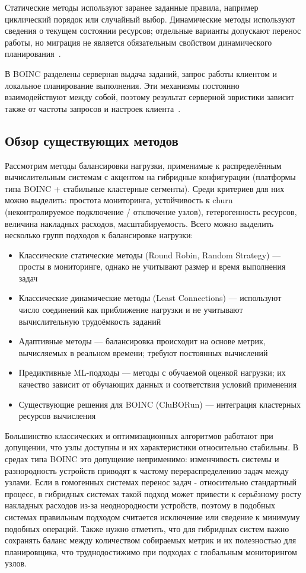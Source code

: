\documentclass[a4paper,12pt]{extarticle}
\begin{document}
Статические методы используют заранее заданные правила, например циклический порядок или случайный выбор. Динамические методы используют сведения о текущем состоянии ресурсов; отдельные варианты допускают перенос работы, но миграция не является обязательным свойством динамического планирования~\cite{lb-in-ds}.

В BOINC разделены серверная выдача заданий, запрос работы клиентом и локальное планирование выполнения. Эти механизмы постоянно взаимодействуют между собой, поэтому результат серверной эвристики зависит также от частоты запросов и настроек клиента~\cite{boinc-platform}.

\subsection{Обзор существующих методов}
Рассмотрим методы балансировки нагрузки, применимые к распределённым вычислительным системам с акцентом на гибридные конфигурации (платформы типа BOINC + стабильные кластерные сегменты). Среди критериев для них можно выделить: простота мониторинга, устойчивость к churn (неконтролируемое подключение / отключение узлов), гетерогенность ресурсов, величина накладных расходов, масштабируемость. Всего можно выделить несколько групп подходов к балансировке нагрузки:

\begin{itemize}
    \item Классические статические методы (Round Robin, Random Strategy) — просты в мониторинге, однако не учитывают размер и время выполнения задач
    \item Классические динамические методы (Least Connections) — используют число соединений как приближение нагрузки и не учитывают вычислительную трудоёмкость заданий
    \item Адаптивные методы — балансировка происходит на основе метрик, вычисляемых в реальном времени; требуют постоянных вычислений
    \item Предиктивные ML-подходы — методы с обучаемой оценкой нагрузки; их качество зависит от обучающих данных и соответствия условий применения~\cite{lb-adv}
    \item Существующие решения для BOINC (CluBORun) — интеграция кластерных ресурсов вычисления~\cite{cluborun}
\end{itemize}

Большинство классических и оптимизационных алгоритмов работают при допущении, что узлы доступны и их характеристики относительно стабильны. В средах типа BOINC это допущение неприменимо: изменчивость системы и разнородность устройств приводят к частому перераспределению задач между узлами. Если в гомогенных системах перенос задач - относительно стандартный процесс, в гибридных системах такой подход может привести к серьёзному росту накладных расходов из-за неоднородности устройств, поэтому в подобных системах правильным подходом считается исключение или сведение к минимуму подобных операций. Также нужно отметить, что для гибридных систем важно сохранять баланс между количеством собираемых метрик и их полезностью для планировщика, что труднодостижимо при подходах с глобальным мониторингом узлов.~\cite{lb-in-cloud}
\end{document}

